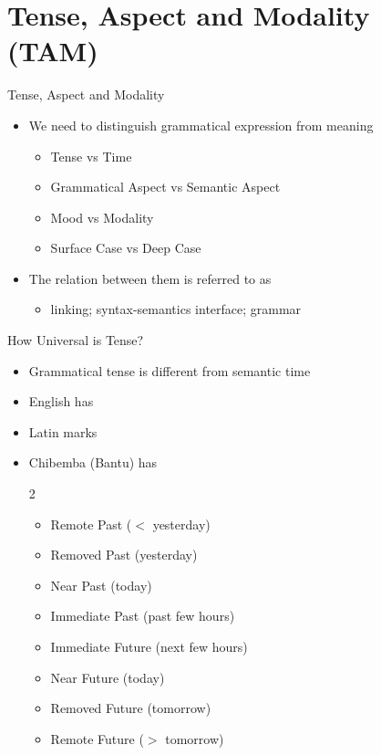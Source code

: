 \newcommand{\mc}{\multicolumn}
\newcommand{\cmm}[1]{\hfill \textnormal{(#1)}}%

\section{Tense, Aspect and Modality (TAM)}

\begin{frame}{Tense, Aspect and Modality}
\begin{itemize}
\item  We need to distinguish grammatical expression from 
  meaning
  \begin{itemize}
  \item  Tense vs Time
  \item  Grammatical Aspect vs Semantic Aspect
  \item  Mood vs Modality
  \item  Surface Case vs Deep Case
  \end{itemize}
\item  The relation between them is referred to as
  \begin{itemize}
  \item  linking; syntax-semantics interface; grammar
  \end{itemize}
\end{itemize} 
 

\end{frame}

\begin{frame}{How Universal is Tense?}
\begin{itemize}
\item  Grammatical tense is different from semantic time
\item  English has 
\item  Latin marks 
\item  Chibemba (Bantu) has 
  \begin{multicols}{2}
  \begin{itemize}
  \item  Remote Past ($<$ yesterday)
  \item  Removed Past (yesterday)
  \item  Near Past (today)
  \item  Immediate Past (past few hours)
  \item Immediate Future (next few hours)
  \item Near Future (today)
  \item Removed Future (tomorrow)
  \item Remote Future ($>$ tomorrow)
  \end{itemize}
\end{multicols}
\end{itemize}

\end{frame}

